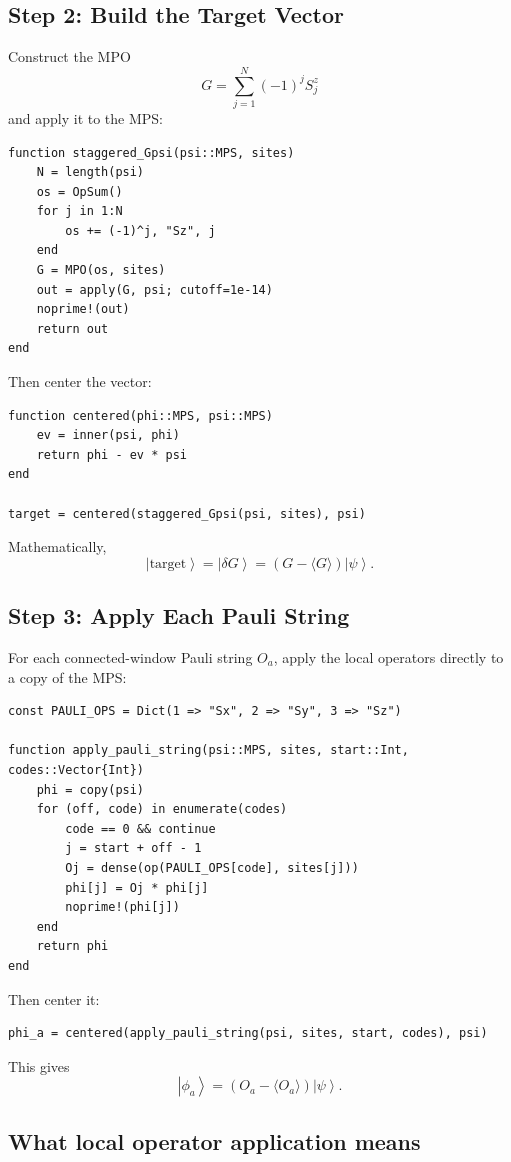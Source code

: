 \documentclass[11pt]{article}
\newcommand{\ket}[1]{\left|#1\right\rangle}
\newcommand{\dd}{\delta}
\begin{document}
\subsection{Step 2: Build the Target Vector}

Construct the MPO
\[
  G=\sum_{j=1}^{N}(-1)^j S^z_j
\]
and apply it to the MPS:
\begin{lstlisting}
function staggered_Gpsi(psi::MPS, sites)
    N = length(psi)
    os = OpSum()
    for j in 1:N
        os += (-1)^j, "Sz", j
    end
    G = MPO(os, sites)
    out = apply(G, psi; cutoff=1e-14)
    noprime!(out)
    return out
end
\end{lstlisting}
Then center the vector:
\begin{lstlisting}
function centered(phi::MPS, psi::MPS)
    ev = inner(psi, phi)
    return phi - ev * psi
end

target = centered(staggered_Gpsi(psi, sites), psi)
\end{lstlisting}
Mathematically,
\[
  \ket{\mathrm{target}}
  =
  \ket{\dd G}
  =
  \left(G-\langle G\rangle\right)\ket{\psi}.
\]

\subsection{Step 3: Apply Each Pauli String}

For each connected-window Pauli string $O_a$, apply the local operators
directly to a copy of the MPS:
\begin{lstlisting}
const PAULI_OPS = Dict(1 => "Sx", 2 => "Sy", 3 => "Sz")

function apply_pauli_string(psi::MPS, sites, start::Int, codes::Vector{Int})
    phi = copy(psi)
    for (off, code) in enumerate(codes)
        code == 0 && continue
        j = start + off - 1
        Oj = dense(op(PAULI_OPS[code], sites[j]))
        phi[j] = Oj * phi[j]
        noprime!(phi[j])
    end
    return phi
end
\end{lstlisting}
Then center it:
\begin{lstlisting}
phi_a = centered(apply_pauli_string(psi, sites, start, codes), psi)
\end{lstlisting}
This gives
\[
  \ket{\phi_a}
  =
  \left(O_a-\langle O_a\rangle\right)\ket{\psi}.
\]

\subsection{What local operator application means}
\end{document}
